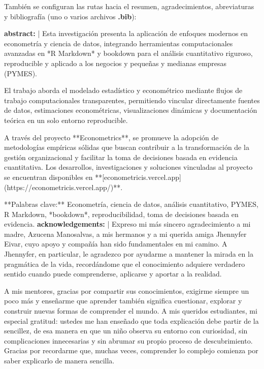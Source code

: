 \documentclass[a4paper, nobind]{templates/ociamthesis}
\newenvironment{Shaded}{\begin{snugshade}}{\end{snugshade}}
\newcommand{\CharTok}[1]{\textcolor[rgb]{0.31,0.60,0.02}{#1}}
\newcommand{\FunctionTok}[1]{\textcolor[rgb]{0.13,0.29,0.53}{\textbf{#1}}}
\newcommand{\KeywordTok}[1]{\textcolor[rgb]{0.13,0.29,0.53}{\textbf{#1}}}
\newcommand{\NormalTok}[1]{#1}
\renewenvironment{Shaded}
{
  \vspace{10pt}%
  \begin{snugshade}%
}{%
  \end{snugshade}%
  \vspace{8pt}%
}
\begin{document}
También se configuran las rutas hacia el resumen, agradecimientos, abreviaturas y bibliografía (uno o varios archivos \textbf{.bib}):

\begin{Shaded}
\begin{Highlighting}[]
\FunctionTok{abstract}\KeywordTok{: }\CharTok{|}
\NormalTok{  Esta investigación presenta la aplicación de enfoques modernos en econometría y ciencia de datos, integrando herramientas computacionales avanzadas en *R Markdown* y \textasciigrave{}bookdown\textasciigrave{} para el análisis cuantitativo riguroso, reproducible y aplicado a los negocios y pequeñas y medianas empresas (PYMES).}
  
\NormalTok{  El trabajo aborda el modelado estadístico y econométrico mediante flujos de trabajo computacionales transparentes, permitiendo vincular directamente fuentes de datos, estimaciones econométricas, visualizaciones dinámicas y documentación teórica en un solo entorno reproducible.}
  
\NormalTok{  A través del proyecto **Econometrics**, se promueve la adopción de metodologías empíricas sólidas que buscan contribuir a la transformación de la gestión organizacional y facilitar la toma de decisiones basada en evidencia cuantitativa. Los desarrollos, investigaciones y soluciones vinculadas al proyecto se encuentran disponibles en **[econometricis.vercel.app](https://econometricis.vercel.app/)**.}
  
\NormalTok{  **Palabras clave:** Econometría, ciencia de datos, análisis cuantitativo, PYMES, R Markdown, *bookdown*, reproducibilidad, toma de decisiones basada en evidencia.}
\FunctionTok{acknowledgements}\KeywordTok{: }\CharTok{|}
\NormalTok{  Expreso mi más sincero agradecimiento a mi madre, Azucena Manosalvas, a mis hermanos y a mi querida amiga Jhennyfer Eivar, cuyo apoyo y compañía han sido fundamentales en mi camino. A Jhennyfer, en particular, le agradezco por ayudarme a mantener la mirada en la pragmática de la vida, recordándome que el conocimiento adquiere verdadero sentido cuando puede comprenderse, aplicarse y aportar a la realidad.}
  
\NormalTok{  A mis mentores, gracias por compartir sus conocimientos, exigirme siempre un poco más y enseñarme que aprender también significa cuestionar, explorar y construir nuevas formas de comprender el mundo. A mis queridos estudiantes, mi especial gratitud: ustedes me han enseñado que toda explicación debe partir de la sencillez, de esa manera en que un niño observa su entorno con curiosidad, sin complicaciones innecesarias y sin abrumar su propio proceso de descubrimiento. Gracias por recordarme que, muchas veces, comprender lo complejo comienza por saber explicarlo de manera sencilla.}
  

\end{Highlighting}
\end{Shaded}
\end{document}
